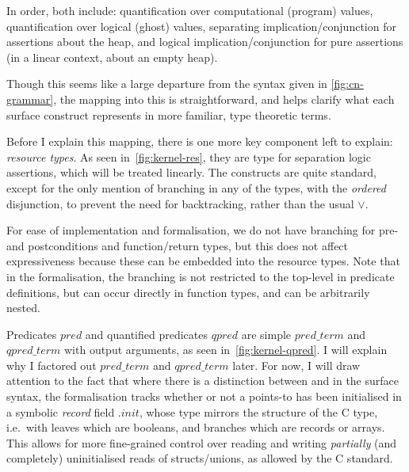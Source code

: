 In order, both include: quantification over computational (program) values,
quantification over logical (ghost) values, separating implication/conjunction
for assertions about the heap, and logical
implication/conjunction for pure assertions (in a linear context, about an
empty heap).

Though this seems like a large departure from the syntax given in
\cref{fig:cn-grammar}, the mapping into this is straightforward, and helps
clarify what each  surface construct represents in more familiar,
type theoretic terms.

Before I explain this mapping, there is one more key component left to explain:
\emph{resource types}. As seen in~\cref{fig:kernel-res}, they are type for
separation logic assertions, which will be treated linearly. The constructs are
quite standard, except for the only mention of branching in any of the types,
with the \emph{ordered} disjunction, to prevent the need for backtracking,
rather than the usual $\vee{}$.

For ease of implementation and formalisation, we do not have branching for pre-
and postconditions and function/return types, but this does not affect
expressiveness because these can be embedded into the resource types. Note that
in the formalisation, the branching is not restricted to the top-level in
predicate definitions, but can occur directly in function types, and can be
arbitrarily nested.

Predicates ${pred}$ and quantified predicates ${qpred}$ are simple
${pred\_term}$ and ${qpred\_term}$ with output arguments, as seen
in~\cref{fig:kernel-qpred}. I will explain why I factored out ${pred\_term}$
and ${qpred\_term}$ later. For now, I will draw attention to the fact that
where there is a distinction between  and  in
the surface syntax, the formalisation tracks whether or not a points-to has
been initialised in a symbolic \emph{record} field ${.init}$, whose type
mirrors the structure of the C type, i.e.\ with leaves which are booleans, and
branches which are records or arrays. This allows for more fine-grained control
over reading and writing \emph{partially} (and completely) uninitialised reads
of structs/unions, as
allowed by the C standard.

